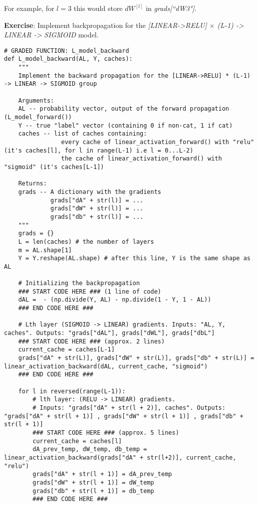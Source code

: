 {For example, for $l=3$ this would store $dW^{[l]}$ in \emph{grads[``dW3"]}.

{\textbf {Exercise}}: Implement backpropagation for the \emph{[LINEAR->RELU] $\times$ (L-1) -> LINEAR -> SIGMOID} model.

\begin{verbatim}
# GRADED FUNCTION: L_model_backward
def L_model_backward(AL, Y, caches):
    """
    Implement the backward propagation for the [LINEAR->RELU] * (L-1) -> LINEAR -> SIGMOID group
    
    Arguments:
    AL -- probability vector, output of the forward propagation (L_model_forward())
    Y -- true "label" vector (containing 0 if non-cat, 1 if cat)
    caches -- list of caches containing:
                every cache of linear_activation_forward() with "relu" (it's caches[l], for l in range(L-1) i.e l = 0...L-2)
                the cache of linear_activation_forward() with "sigmoid" (it's caches[L-1])
    
    Returns:
    grads -- A dictionary with the gradients
             grads["dA" + str(l)] = ... 
             grads["dW" + str(l)] = ...
             grads["db" + str(l)] = ... 
    """
    grads = {}
    L = len(caches) # the number of layers
    m = AL.shape[1]
    Y = Y.reshape(AL.shape) # after this line, Y is the same shape as AL
    
    # Initializing the backpropagation
    ### START CODE HERE ### (1 line of code)
    dAL =  - (np.divide(Y, AL) - np.divide(1 - Y, 1 - AL))
    ### END CODE HERE ###
    
    # Lth layer (SIGMOID -> LINEAR) gradients. Inputs: "AL, Y, caches". Outputs: "grads["dAL"], grads["dWL"], grads["dbL"]
    ### START CODE HERE ### (approx. 2 lines)
    current_cache = caches[L-1]
    grads["dA" + str(L)], grads["dW" + str(L)], grads["db" + str(L)] =  linear_activation_backward(dAL, current_cache, "sigmoid")
    ### END CODE HERE ###
    
    for l in reversed(range(L-1)):
        # lth layer: (RELU -> LINEAR) gradients.
        # Inputs: "grads["dA" + str(l + 2)], caches". Outputs: "grads["dA" + str(l + 1)] , grads["dW" + str(l + 1)] , grads["db" + str(l + 1)] 
        ### START CODE HERE ### (approx. 5 lines)
        current_cache = caches[l]
        dA_prev_temp, dW_temp, db_temp = linear_activation_backward(grads["dA" + str(l+2)], current_cache, "relu")
        grads["dA" + str(l + 1)] = dA_prev_temp
        grads["dW" + str(l + 1)] = dW_temp
        grads["db" + str(l + 1)] = db_temp
        ### END CODE HERE ###


\end{verbatim}}
